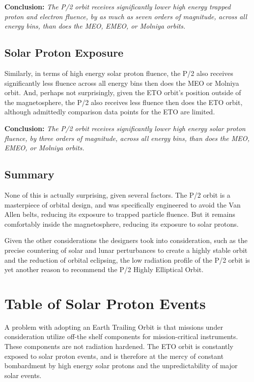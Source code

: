 \documentclass[11pt]{article}
\begin{document}
\textbf{Conclusion:} \textit{The P/2 orbit receives significantly lower high energy trapped proton and electron fluence, by as much as seven orders of magnitude, across all energy bins, than does the MEO, EMEO, or Molniya orbits.} 

\subsection{Solar Proton Exposure}

Similarly, in terms of high energy solar proton fluence, the P/2 also receives significantly less fluence across all energy bins then does the MEO or Molniya orbit. And, perhaps not surprisingly, given the ETO orbit's position outside of the magnetosphere, the P/2 also receives less fluence then does the ETO orbit, although admittedly comparison data points for the ETO are limited.

\vspace{0.5cm}

\textbf{Conclusion:} \textit{The P/2 orbit receives significantly lower high energy solar proton fluence, by three orders of magnitude, across all energy bins, than does the MEO, EMEO, or Molniya orbits.} 

\subsection{Summary}

None of this is actually surprising, given several factors. The P/2 orbit is a masterpiece of orbital design, and was specifically engineered to avoid the Van Allen belts, reducing its exposure to trapped particle fluence. But it remains comfortably inside the magnetosphere, reducing its exposure to solar protons. 

Given the other considerations the designers took into consideration, such as the precise countering of solar and lunar perturbances to create a highly stable orbit and the reduction of orbital eclipsing, the low radiation profile of the P/2 orbit is yet another reason to recommend the P/2 Highly Elliptical Orbit.

\newpage
\appendix
\appendixpage
\addappheadtotoc

\section{Table of Solar Proton Events}

A problem with adopting an Earth Trailing Orbit is that missions under consideration utilize off-the shelf components for mission-critical instruments. These components are not radiation hardened. The ETO orbit is constantly  exposed to solar proton events, and is therefore at the mercy of constant bombardment by high energy solar protons and the unpredictability of major solar events. 
\end{document}
